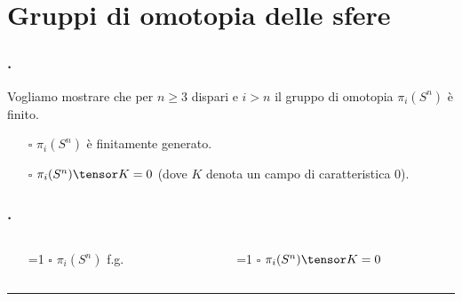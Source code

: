 \section{Gruppi di omotopia delle sfere}
\newcommand{\sphereheader}[2]{%
\begin{columns}
\begin{column}{0.5\textwidth}
\begin{itemize}
\item[\ifnum #1=1 \done\else \(\square\)\fi] \(\pi_i(S^n)\) f.g.
\end{itemize}
\end{column}
\begin{column}{0.5\textwidth}
\begin{itemize}
\item[\ifnum #2=1 \done\else \(\square\)\fi] \(\pi_i(S^n)\tensor K=0\)
\end{itemize}
\end{column}
\end{columns}
\rule{\textwidth}{0.4pt}
}
\begin{frame}
\frametitle{.}
Vogliamo mostrare che per \(n\ge 3\) dispari e \(i>n\) il gruppo di omotopia \(\pi_i(S^n)\) è finito.
\pause
\begin{itemize}[<+->]
\item[\(\square\)] \(\pi_i(S^n)\) è finitamente generato.
\item[\(\square\)] \(\pi_i(S^n)\tensor K=0\) (dove \(K\) denota un campo di caratteristica \(0\)).
\end{itemize}
\end{frame}
\begin{frame}[t]
\frametitle{.}
\sphereheader{0}{0}
\end{frame}
